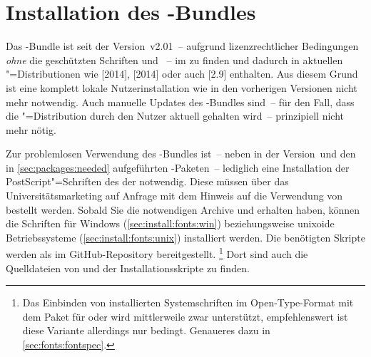 \section{Installation des \TUDScript-Bundles}
\label{sec:install}%
%
%
%
%
Das \TUDScript-Bundle ist seit der Version~v2.01~-- aufgrund lizenzrechtlicher 
Bedingungen \emph{ohne} die geschützten Schriften \Univers und \DIN~-- im 
\foreignlanguage{english}{%
} zu finden und dadurch in aktuellen "=Distributionen wie 
[2014], [2014] 
oder auch [2.9] enthalten. Aus diesem Grund ist 
eine komplett lokale Nutzerinstallation wie in den vorherigen Versionen nicht 
mehr notwendig. Auch manuelle Updates des \TUDScript-Bundles sind~-- für den 
Fall, dass die "=Distribution durch den Nutzer aktuell gehalten 
wird~-- prinzipiell nicht mehr nötig.

Zur problemlosen Verwendung des \TUDScript-Bundles ist~-- neben \KOMAScript{} in
der Version~\vKOMAScript und den in \autoref{sec:packages:needed} aufgeführten 
-Paketen~-- lediglich eine Installation der PostScript"=Schriften 
des \CDs der \TnUD notwendig. Diese müssen über das Universitätsmarketing auf 
%
{Anfrage} mit dem Hinweis auf die Verwendung von  bestellt 
werden. Sobald Sie die notwendigen Archive  und 
 erhalten haben, können die Schriften für Windows 
(\autoref{sec:install:fonts:win}) beziehungsweise unixoide Betriebssysteme 
(\autoref{sec:install:fonts:unix}) installiert werden. Die benötigten Skripte 
werden als  
im GitHub-Repository  
bereitgestellt.%
\footnote{%
  Das Einbinden von installierten Systemschriften im Open-Type-Format mit dem 
  Paket  für  oder  wird 
  mittlerweile zwar unterstützt, empfehlenswert ist diese Variante allerdings 
  nur bedingt. Genaueres dazu in \autoref{sec:fonts:fontspec}.%
}
Dort sind auch die Quelldateien von \TUDScript und der Installationsskripte zu 
finden.


